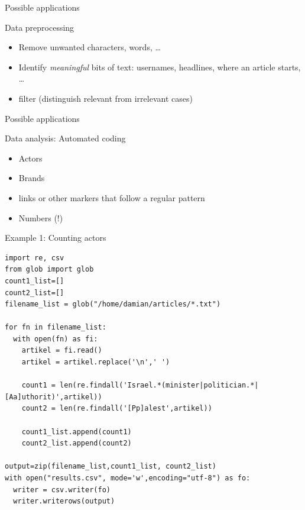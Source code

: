\documentclass{beamer}
\begin{document}
\begin{frame}{Possible applications}
\begin{block}{Data preprocessing}
\begin{itemize}
\item Remove unwanted characters, words, \ldots
\item Identify \emph{meaningful} bits of text: usernames, headlines, where an article starts, \ldots
\item filter (distinguish relevant from irrelevant cases)
\end{itemize}
\end{block}
\end{frame}


\begin{frame}{Possible applications}
\begin{block}{Data analysis: Automated coding}
\begin{itemize}
\item Actors
\item Brands
\item links or other markers that follow a regular pattern
\item Numbers (!)
\end{itemize}
\end{block}
\end{frame}

\begin{frame}{Example 1: Counting actors}
\begin{lstlisting}
import re, csv
from glob import glob
count1_list=[]
count2_list=[]
filename_list = glob("/home/damian/articles/*.txt")

for fn in filename_list:
  with open(fn) as fi:
    artikel = fi.read()
    artikel = artikel.replace('\n',' ')

    count1 = len(re.findall('Israel.*(minister|politician.*|[Aa]uthorit)',artikel))
    count2 = len(re.findall('[Pp]alest',artikel))

    count1_list.append(count1)
    count2_list.append(count2)

output=zip(filename_list,count1_list, count2_list)
with open("results.csv", mode='w',encoding="utf-8") as fo:
  writer = csv.writer(fo)
  writer.writerows(output)
\end{lstlisting}
\end{frame}
\end{document}
